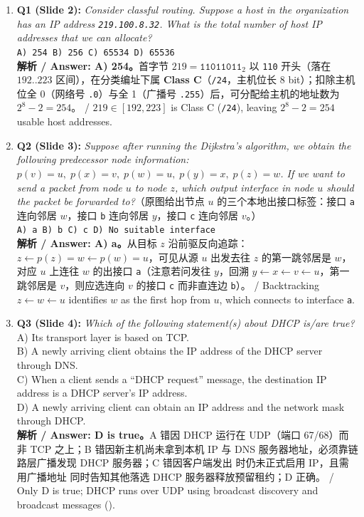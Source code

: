 \begin{enumerate}
\item \textbf{Q1 (Slide 2):} \emph{Consider classful routing. Suppose a host in the organization has an IP address \texttt{219.100.8.32}. What is the total number of host IP addresses that we can allocate?} \\
\texttt{A) 254 \quad B) 256 \quad C) 65534 \quad D) 65536} \\
\textbf{解析 / Answer: A) 254。}首字节 $219 = \mathtt{11011011}_2$ 以 \texttt{110} 开头（落在 $192..223$ 区间），在分类编址下属 \textbf{Class C}（\texttt{/24}，主机位长 8 bit）；扣除主机位全 0（网络号 \texttt{.0}）与全 1（广播号 \texttt{.255}）后，可分配给主机的地址数为 $2^8 - 2 = 254$。 / $219 \in [192,223]$ is Class C (\texttt{/24}), leaving $2^8 - 2 = 254$ usable host addresses.

\item \textbf{Q2 (Slide 3):} \emph{Suppose after running the Dijkstra's algorithm, we obtain the following predecessor node information: $p(v) = u,\; p(x) = v,\; p(w) = u,\; p(y) = x,\; p(z) = w$. If we want to send a packet from node $u$ to node $z$, which output interface in node $u$ should the packet be forwarded to?}（原图给出节点 $u$ 的三个本地出接口标签：接口 \texttt{a} 连向邻居 $w$，接口 \texttt{b} 连向邻居 $y$，接口 \texttt{c} 连向邻居 $v$。） \\
\texttt{A) a \quad B) b \quad C) c \quad D) No suitable interface} \\
\textbf{解析 / Answer: A) a。}从目标 $z$ 沿前驱反向追踪：$z \leftarrow p(z)=w \leftarrow p(w)=u$，可见从源 $u$ 出发去往 $z$ 的第一跳邻居是 $w$，对应 $u$ 上连往 $w$ 的出接口 \texttt{a}（注意若问发往 $y$，回溯 $y \leftarrow x \leftarrow v \leftarrow u$，第一跳邻居是 $v$，则应选连向 $v$ 的接口 \texttt{c} 而非直连边 \texttt{b}）。 / Backtracking $z \leftarrow w \leftarrow u$ identifies $w$ as the first hop from $u$, which connects to interface \texttt{a}.

\item \textbf{Q3 (Slide 4):} \emph{Which of the following statement(s) about DHCP is/are true?} \\
A) Its transport layer is based on TCP. \\
B) A newly arriving client obtains the IP address of the DHCP server through DNS. \\
C) When a client sends a ``DHCP request'' message, the destination IP address is a DHCP server's IP address. \\
D) A newly arriving client can obtain an IP address and the network mask through DHCP. \\
\textbf{解析 / Answer: D is true。}A 错因 DHCP 运行在 UDP（端口 67/68）而非 TCP 之上；B 错因新主机尚未拿到本机 IP 与 DNS 服务器地址，必须靠链路层广播发现 DHCP 服务器；C 错因客户端发出  时仍未正式启用 IP，且需用广播地址  同时告知其他落选 DHCP 服务器释放预留租约；D 正确。 / Only D is true; DHCP runs over UDP using broadcast discovery and broadcast  messages ().


\end{enumerate}
